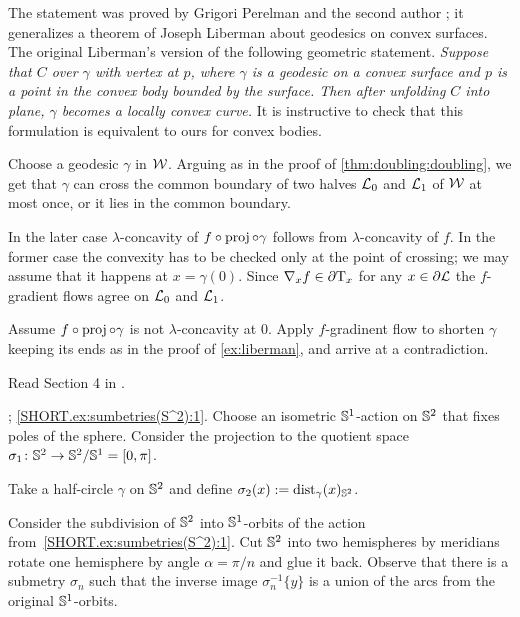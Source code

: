 The statement was proved by Grigori Perelman and the second author \cite{perelman-petrunin};
it generalizes a theorem of Joseph Liberman \cite{liberman} about geodesics on convex surfaces.
The original Liberman's version of the following geometric statement.
\textit{Suppose that $C$ over $\gamma$ with vertex at $p$,
where $\gamma$ is a geodesic on a convex surface and $p$ is a point in the convex body bounded by the surface.
Then after unfolding $C$ into plane, $\gamma$ becomes a locally convex curve.}
It is instructive to check that this formulation is equivalent to ours for convex bodies.

Choose a geodesic $\gamma$ in $\mathcal{W}$.
Arguing as in the proof of \ref{thm:doubling:doubling}, we get 
that $\gamma$ can cross the common boundary of two halves $\mathcal{L}_0$ and $\mathcal{L}_1$ of $\mathcal{W}$ at most once, or it lies in the common boundary.

In the later case $\lambda$-concavity of $f\circ\operatorname{\rm proj}\nolimits\circ\gamma$ follows from $\lambda$-concavity of $f$.
In the former case the convexity has to be checked only at the point of crossing;
we may assume that it happens at $x=\gamma(0)$.
Since $\nabla_xf\in\partial\mathrm{T}_x$ for any $x\in\partial\mathcal{L}$ the $f$-gradient flows agree on $\mathcal{L}_0$ and $\mathcal{L}_1$.

Assume $f\circ\operatorname{\rm proj}\nolimits\circ\gamma$ is not $\lambda$-concavity at $0$.
Apply $f$-gradinent flow to shorten $\gamma$ keeping its ends as in the proof of \ref{ex:liberman},
and arrive at a contradiction.

 Read Section 4  in \cite{terng-thorbergsson}.

\parbf{\ref{ex:sumbetries(S^2)}}; \ref{SHORT.ex:sumbetries(S^2):1}.
Choose an isometric $\mathbb{S}^1$-action on $\mathbb{S}^2$ that fixes poles of the sphere.
Consider the projection to the quotient space $\sigma_1\:\SSS^2\z\to \SSS^2/\SSS^1=[0,\pi]$.

Take a half-circle $\gamma$ on $\mathbb{S}^2$ and define 
$\sigma_2(x)\mathrel{:=}\mathrm{dist}_\gamma(x)_{\mathbb{S}^2}$.

Consider the subdivision of $\mathbb{S}^2$ into $\mathbb{S}^1$-orbits of the action from~\ref{SHORT.ex:sumbetries(S^2):1}.
Cut $\mathbb{S}^2$ into two hemispheres by meridians rotate one hemisphere by angle $\alpha=\pi/n$ and glue it back.
Observe that there is a submetry $\sigma_n$ such that the inverse image $\sigma_n^{-1}\{y\}$ is a union of the arcs from the original $\mathbb{S}^1$-orbits.

